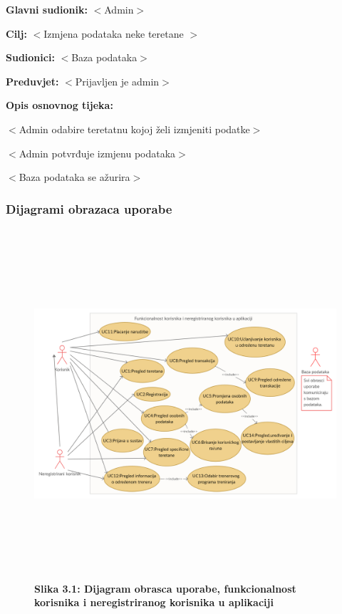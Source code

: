 					\noindent {}
					\begin{packed_item}
	
						\item \textbf{Glavni sudionik: } $<$Admin$>$
						\item  \textbf{Cilj:} $<$Izmjena podataka neke teretane $>$
						\item  \textbf{Sudionici:} $<$Baza podataka$>$
						\item  \textbf{Preduvjet:} $<$Prijavljen je admin$>$
						\item  \textbf{Opis osnovnog tijeka:}
						
						\item[] \begin{packed_enum}
	
							\item $<$Admin odabire teretatnu kojoj želi izmjeniti podatke$>$
							\item $<$Admin potvrđuje izmjenu podataka$>$
							\item $<$Baza podataka se ažurira$>$
						\end{packed_enum}
						
	
					\end{packed_item}
				
					
				\subsubsection{Dijagrami obrazaca uporabe}
				\begin{figure}
				\includegraphics[height= 13cm,width=1.2\textwidth]{dokumentacija/slike/obrazac1.jpg}
				\textbf{Slika 3.1: Dijagram obrasca uporabe, funkcionalnost korisnika i neregistriranog korisnika u aplikaciji  }
				
				\end{figure}
				
